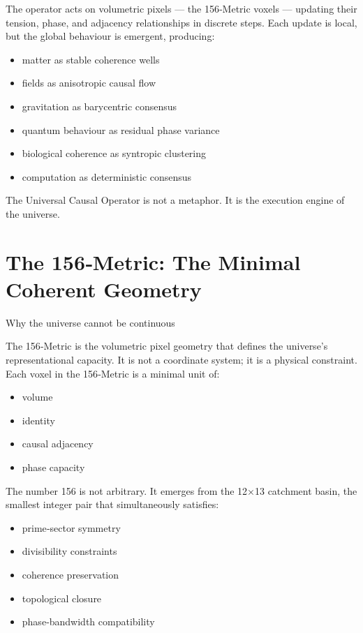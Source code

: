 \documentclass[reprint,amsmath,amssymb,aps,prl,floatfix]{revtex4-2}
\begin{document}
\begin{itemize}
The operator acts on volumetric pixels — the 156‑Metric voxels — updating their tension, phase, and adjacency relationships in discrete steps. Each update is local, but the global behaviour is emergent, producing:
\begin{itemize}
\item matter as stable coherence wells  
\item fields as anisotropic causal flow  
\item gravitation as barycentric consensus  
\item quantum behaviour as residual phase variance  
\item biological coherence as syntropic clustering  
\item computation as deterministic consensus  
\end{itemize}

The Universal Causal Operator is not a metaphor.  
It is the execution engine of the universe.

\section{The 156‑Metric: The Minimal Coherent Geometry}

Why the universe cannot be continuous

The 156‑Metric is the volumetric pixel geometry that defines the universe’s representational capacity. It is not a coordinate system; it is a physical constraint. Each voxel in the 156‑Metric is a minimal unit of:
\begin{itemize}
\item volume  
\item identity  
\item causal adjacency  
\item phase capacity  
\end{itemize}
\medskip

The number 156 is not arbitrary. It emerges from the 12×13 catchment basin, the smallest integer pair that simultaneously satisfies:
\begin{itemize}
\item prime‑sector symmetry  
\item divisibility constraints  
\item coherence preservation  
\item topological closure  
\item phase‑bandwidth compatibility  
\end{itemize}
\medskip



\end{itemize}
\end{document}
